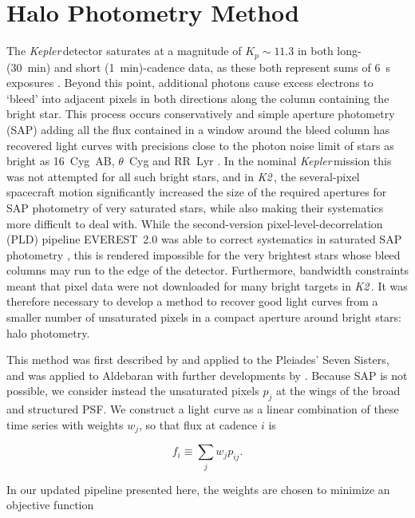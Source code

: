 \documentclass[modern]{aastex62}
\newcommand\kepler{\emph{Kepler}\,}
\newcommand\ktwo{\emph{K2}\,}
\begin{document}
\section{Halo Photometry Method}
\label{method}

The \kepler detector saturates at a magnitude of $K_p \sim 11.3$ in both long- (30~min) and short (1~min)-cadence data, as these both represent sums of 6~s exposures \citep{Gilliland2010}. Beyond this point, additional photons cause excess electrons to `bleed' into adjacent pixels in both directions along the column containing the bright star. This process occurs conservatively and simple aperture photometry (SAP) adding all the flux contained in a window around the bleed column has recovered light curves with precisions close to the photon noise limit of stars as bright as 16~Cyg~AB, $\theta$~Cyg and RR~Lyr \citep[e.g.][]{Kolenberg2011,2013MNRAS.433.1262W,Guzik2016}. In the nominal \kepler mission this was not attempted for all such bright stars, and in \ktwo, the several-pixel spacecraft motion significantly increased the size of the required apertures for SAP photometry of very saturated stars, while also making their systematics more difficult to deal with. While the second-version pixel-level-decorrelation (PLD) pipeline EVEREST~2.0 was able to correct systematics in saturated SAP photometry \citep{everest2}, this is rendered impossible for the very brightest stars whose bleed columns may run to the edge of the detector. Furthermore, bandwidth constraints meant that pixel data were not downloaded for many bright targets in \ktwo. It was therefore necessary to develop a method to recover good light curves from a smaller number of unsaturated pixels in a compact aperture around bright stars: halo photometry.

This method was first described by \citet{White2017} and applied to the Pleiades' Seven Sisters, and was applied to Aldebaran with further developments by \citet{Farr2018}. Because SAP is not possible, we consider instead the unsaturated pixels $p_j$ at the wings of the broad and structured PSF. We construct a light curve as a linear combination of these time series with weights $w_j$, so that flux at cadence $i$ is 

\begin{equation}
    f_i \equiv \sum_j {w_j p_{ij}}.
\end{equation}

\noindent In our updated pipeline presented here, the weights are chosen to minimize an objective function
\end{document}
